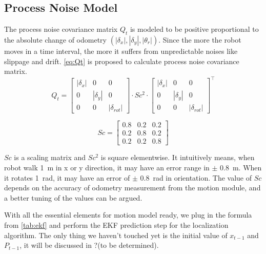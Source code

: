 \subsection{Process Noise Model}
\label{sub:Process Noise Model}

The process noise covariance matrix $Q_t$ is modeled to be positive proportional to the absolute change of odometry $(|\delta_{x}|, |\delta_{y}|, |\theta_{r}|)$. Since the more the robot moves in a time interval, the more it suffers from unpredictable noises like slippage and drift. \autoref{eq:Qt} is proposed to calculate process noise covariance matrix.
\begin{equation}\label{eq:Qt} 
Q_t = 
\begin{bmatrix}
|\delta_x| & 0 & 0\\ 
0 &  |\delta_y|& 0\\ 
0 & 0 & |\delta_{rot}|
\end{bmatrix} 
\cdot
Sc^2 
\cdot
\begin{bmatrix}
|\delta_x| & 0 & 0\\ 
0 &  |\delta_y|& 0\\ 
0 & 0 & |\delta_{rot}|
\end{bmatrix}^\top
\end{equation}

\begin{equation}\label{eq:Sc} 
Sc = \begin{bmatrix}
0.8 & 0.2 & 0.2\\ 
0.2 &  0.8 & 0.2\\ 
0.2 & 0.2 & 0.8
\end{bmatrix}
\end{equation}

$Sc$ is a scaling matrix and $Sc^2$ is square elementwise. It intuitively means, when robot walk \SI{1}{\meter} in x or y direction, it may have an error range in $\pm$ \SI{0.8}{\meter}. When it rotates \SI{1}{\radian}, it may have an error of $\pm$ \SI{0.8}{\radian} in orientation. The value of $Sc$ depends on the accuracy of odometry measurement from the motion module, and a better tuning of the values can be argued.

With all the essential elements for motion model ready, we plug in the formula from \autoref{tab:ekf} and perform the \gls{EKF} prediction step for the localization algorithm. The only thing we haven't touched yet is the initial value of $x_{t-1}$ and $P_{t-1}$, it will be discussed in ?(to be determined).  



